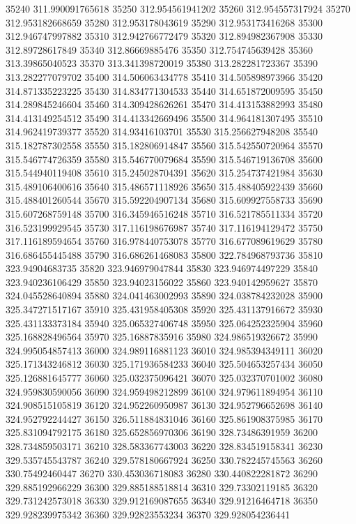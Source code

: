 {35240 311.990091765618
35250 312.954561941202
35260 312.954557317924
35270 312.953182668659
35280 312.953178043619
35290 312.953173416268
35300 312.946747997882
35310 312.942766772479
35320 312.894982367908
35330 312.89728617849
35340 312.86669885476
35350 312.754745639428
35360 313.39865040523
35370 313.341398720019
35380 313.282281723367
35390 313.282277079702
35400 314.506063434778
35410 314.505898973966
35420 314.871335223225
35430 314.834771304533
35440 314.651872009595
35450 314.289845246604
35460 314.309428626261
35470 314.413153882993
35480 314.413149254512
35490 314.413342669496
35500 314.964181307495
35510 314.962419739377
35520 314.93416103701
35530 315.256627948208
35540 315.182787302558
35550 315.182806914847
35560 315.542550720964
35570 315.546774726359
35580 315.546770079684
35590 315.546719136708
35600 315.544940119408
35610 315.245028704391
35620 315.254737421984
35630 315.489106400616
35640 315.486571118926
35650 315.488405922439
35660 315.488401260544
35670 315.592204907134
35680 315.609927558733
35690 315.607268759148
35700 316.345946516248
35710 316.521785511334
35720 316.523199929545
35730 317.116198676987
35740 317.116194129472
35750 317.116189594654
35760 316.978440753078
35770 316.677089619629
35780 316.686455445488
35790 316.686261468083
35800 322.784968793736
35810 323.94904683735
35820 323.946979047844
35830 323.946974497229
35840 323.940236106429
35850 323.94023156022
35860 323.940142959627
35870 324.045528640894
35880 324.041463002993
35890 324.038784232028
35900 325.347271517167
35910 325.431958405308
35920 325.431137916672
35930 325.431133373184
35940 325.065327406748
35950 325.064252325904
35960 325.168828496564
35970 325.16887835916
35980 324.986519326672
35990 324.995054857413
36000 324.989116881123
36010 324.985394349111
36020 325.171343246812
36030 325.171936584233
36040 325.504653257434
36050 325.126881645777
36060 325.032375096421
36070 325.032370701002
36080 324.959830590056
36090 324.959498212899
36100 324.979611894954
36110 324.908515105819
36120 324.952260950987
36130 324.952796652698
36140 324.952792244427
36150 326.511884831046
36160 325.861908375985
36170 325.831094792175
36180 325.652856970306
36190 328.73486391959
36200 328.734859503171
36210 328.583367743003
36220 328.834519158341
36230 329.535745543787
36240 329.578180667924
36250 330.782245745563
36260 330.75492460447
36270 330.453036718083
36280 330.440822281872
36290 329.885192966229
36300 329.885188518814
36310 329.73302119185
36320 329.731242573018
36330 329.912169087655
36340 329.91216464718
36350 329.928239975342
36360 329.92823553234
36370 329.928054236441
}
